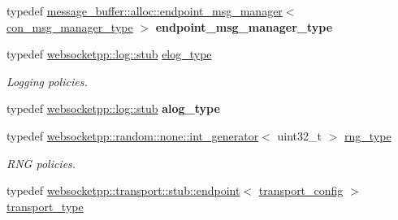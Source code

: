\begin{DoxyCompactItemize}
\item 
\mbox{\label{structwebsocketpp_1_1config_1_1minimal__server_aeb6079297c7d7ceb1742178e00d11b34}} 
typedef \mbox{\hyperlink{classwebsocketpp_1_1message__buffer_1_1alloc_1_1endpoint__msg__manager}{message\+\_\+buffer\+::alloc\+::endpoint\+\_\+msg\+\_\+manager}}$<$ \mbox{\hyperlink{classwebsocketpp_1_1message__buffer_1_1alloc_1_1con__msg__manager}{con\+\_\+msg\+\_\+manager\+\_\+type}} $>$ {\bfseries endpoint\+\_\+msg\+\_\+manager\+\_\+type}
\item 
\mbox{\label{structwebsocketpp_1_1config_1_1minimal__server_ab8a516661fb2ddd3a3c377823b623c1a}} 
typedef \mbox{\hyperlink{classwebsocketpp_1_1log_1_1stub}{websocketpp\+::log\+::stub}} \mbox{\hyperlink{structwebsocketpp_1_1config_1_1minimal__server_ab8a516661fb2ddd3a3c377823b623c1a}{elog\+\_\+type}}
\begin{DoxyCompactList}\small\item\em Logging policies. \end{DoxyCompactList}\item 
\mbox{\label{structwebsocketpp_1_1config_1_1minimal__server_a9296068cfeabe4786e08691cd755f9b3}} 
typedef \mbox{\hyperlink{classwebsocketpp_1_1log_1_1stub}{websocketpp\+::log\+::stub}} {\bfseries alog\+\_\+type}
\item 
\mbox{\label{structwebsocketpp_1_1config_1_1minimal__server_a7f3520a016124fc86f907bcf934f74f2}} 
typedef \mbox{\hyperlink{classwebsocketpp_1_1random_1_1none_1_1int__generator}{websocketpp\+::random\+::none\+::int\+\_\+generator}}$<$ uint32\+\_\+t $>$ \mbox{\hyperlink{structwebsocketpp_1_1config_1_1minimal__server_a7f3520a016124fc86f907bcf934f74f2}{rng\+\_\+type}}
\begin{DoxyCompactList}\small\item\em R\+NG policies. \end{DoxyCompactList}\item 
\mbox{\label{structwebsocketpp_1_1config_1_1minimal__server_a6e5badb1b21e44416a801ed216a3c72e}} 
typedef \mbox{\hyperlink{classwebsocketpp_1_1transport_1_1stub_1_1endpoint}{websocketpp\+::transport\+::stub\+::endpoint}}$<$ \mbox{\hyperlink{structwebsocketpp_1_1config_1_1minimal__server_1_1transport__config}{transport\+\_\+config}} $>$ \mbox{\hyperlink{structwebsocketpp_1_1config_1_1minimal__server_a6e5badb1b21e44416a801ed216a3c72e}{transport\+\_\+type}}

\end{DoxyCompactItemize}
